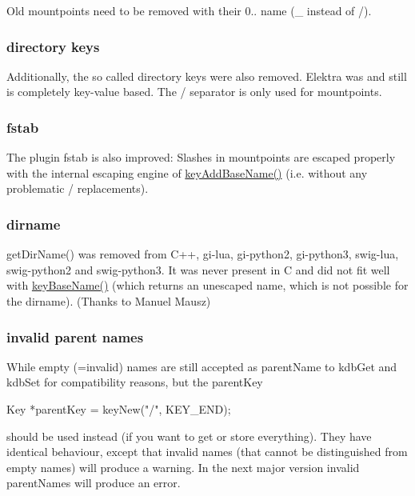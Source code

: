 Old mountpoints need to be removed with their 0.. name ({\ttfamily \+\_\+} instead of {\ttfamily /}).

\subsubsection*{directory keys}

Additionally, the so called directory keys were also removed. Elektra was and still is completely key-\/value based. The {\ttfamily /} separator is only used for mountpoints.

\subsubsection*{fstab}

The plugin fstab is also improved\+: Slashes in mountpoints are escaped properly with the internal escaping engine of \hyperlink{group__keyname_gaa942091fc4bd5c2699e49ddc50829524}{key\+Add\+Base\+Name()} (i.\+e. without any problematic {\ttfamily /} replacements).

\subsubsection*{dirname}

get\+Dir\+Name() was removed from C++, gi-\/lua, gi-\/python2, gi-\/python3, swig-\/lua, swig-\/python2 and swig-\/python3. It was never present in C and did not fit well with \hyperlink{group__keyname_gaaff35e7ca8af5560c47e662ceb9465f5}{key\+Base\+Name()} (which returns an unescaped name, which is not possible for the dirname). (Thanks to Manuel Mausz)

\subsubsection*{invalid parent names}

While empty (=invalid) names are still accepted as parent\+Name to {\ttfamily kdb\+Get} and {\ttfamily kdb\+Set} for compatibility reasons, but the parent\+Key \begin{DoxyVerb}Key *parentKey = keyNew("/", KEY_END);
\end{DoxyVerb}


should be used instead (if you want to get or store everything). They have identical behaviour, except that invalid names (that cannot be distinguished from empty names) will produce a warning. In the next major version invalid parent\+Names will produce an error.

